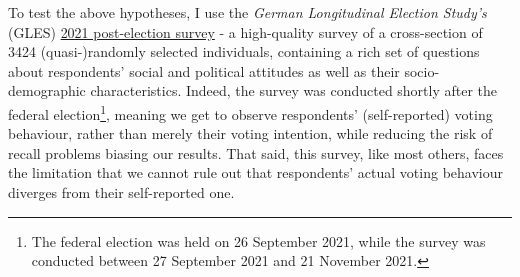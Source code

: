 \documentclass[
]{article}
\begin{document}
To test the above hypotheses, I use the \emph{German Longitudinal
Election Study's} (GLES)
\href{https://search.gesis.org/research_data/ZA7701}{2021 post-election
survey} - a high-quality survey of a cross-section of 3424
(quasi-)randomly selected individuals, containing a rich set of
questions about respondents' social and political attitudes as well as
their socio-demographic characteristics. Indeed, the survey was
conducted shortly after the federal election\footnote{The federal
  election was held on 26 September 2021, while the survey was conducted
  between 27 September 2021 and 21 November 2021.}, meaning we get to
observe respondents' (self-reported) voting behaviour, rather than
merely their voting intention, while reducing the risk of recall
problems biasing our results. That said, this survey, like most others,
faces the limitation that we cannot rule out that respondents' actual
voting behaviour diverges from their self-reported one.
\end{document}
